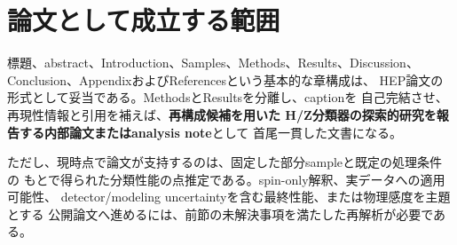 \documentclass[xelatex,ja=standard,a4paper,10pt]{bxjsarticle}
\begin{document}
\section{論文として成立する範囲}

標題、abstract、Introduction、Samples、Methods、Results、Discussion、
Conclusion、AppendixおよびReferencesという基本的な章構成は、
HEP論文の形式として妥当である。MethodsとResultsを分離し、captionを
自己完結させ、再現性情報と引用を補えば、\textbf{再構成候補を用いた
H/Z分類器の探索的研究を報告する内部論文またはanalysis note}として
首尾一貫した文書になる。

ただし、現時点で論文が支持するのは、固定した部分sampleと既定の処理条件の
もとで得られた分類性能の点推定である。spin-only解釈、実データへの適用可能性、
detector/modeling uncertaintyを含む最終性能、または物理感度を主題とする
公開論文へ進めるには、前節の未解決事項を満たした再解析が必要である。
\end{document}
